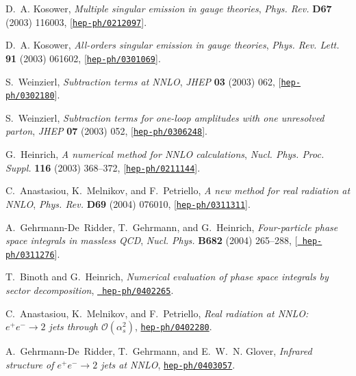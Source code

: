 \documentclass[paper,notoc,nohyper]{JHEP3}
\begin{document}
\begin{thebibliography}{10}
D.~A. Kosower, {\it Multiple singular emission in gauge theories},  {\em Phys.
  Rev.} {\bf D67} (2003) 116003,
  [\href{http://xxx.lanl.gov/abs/hep-ph/0212097}{{\tt hep-ph/0212097}}].

D.~A. Kosower, {\it All-orders singular emission in gauge theories},  {\em
  Phys. Rev. Lett.} {\bf 91} (2003) 061602,
  [\href{http://xxx.lanl.gov/abs/hep-ph/0301069}{{\tt hep-ph/0301069}}].

S.~Weinzierl, {\it Subtraction terms at {NNLO}},  {\em JHEP} {\bf 03} (2003)
  062, [\href{http://xxx.lanl.gov/abs/hep-ph/0302180}{{\tt hep-ph/0302180}}].

S.~Weinzierl, {\it Subtraction terms for one-loop amplitudes with one
  unresolved parton},  {\em JHEP} {\bf 07} (2003) 052,
  [\href{http://xxx.lanl.gov/abs/hep-ph/0306248}{{\tt hep-ph/0306248}}].

G.~Heinrich, {\it A numerical method for {NNLO} calculations},  {\em Nucl.
  Phys. Proc. Suppl.} {\bf 116} (2003) 368--372,
  [\href{http://xxx.lanl.gov/abs/hep-ph/0211144}{{\tt hep-ph/0211144}}].

C.~Anastasiou, K.~Melnikov, and F.~Petriello, {\it A new method for real
  radiation at {NNLO}},  {\em Phys. Rev.} {\bf D69} (2004) 076010,
  [\href{http://xxx.lanl.gov/abs/hep-ph/0311311}{{\tt hep-ph/0311311}}].

A.~Gehrmann-De~Ridder, T.~Gehrmann, and G.~Heinrich, {\it Four-particle phase
  space integrals in massless {QCD}},  {\em Nucl. Phys.} {\bf B682} (2004)
  265--288, [\href{http://xxx.lanl.gov/abs/hep-ph/0311276}{{\tt
  hep-ph/0311276}}].

T.~Binoth and G.~Heinrich, {\it Numerical evaluation of phase space integrals
  by sector decomposition},  \href{http://xxx.lanl.gov/abs/hep-ph/0402265}{{\tt
  hep-ph/0402265}}.

C.~Anastasiou, K.~Melnikov, and F.~Petriello, {\it Real radiation at {NNLO}:
  $e^+ e^- \to 2$ jets through $\mathcal{O}(\alpha_s^2)$},
  \href{http://xxx.lanl.gov/abs/hep-ph/0402280}{{\tt hep-ph/0402280}}.

A.~Gehrmann-De~Ridder, T.~Gehrmann, and E.~W.~N. Glover, {\it Infrared
  structure of $e^+ e^- \to 2$ jets at {NNLO}},
  \href{http://xxx.lanl.gov/abs/hep-ph/0403057}{{\tt hep-ph/0403057}}.


\end{thebibliography}
\end{document}
